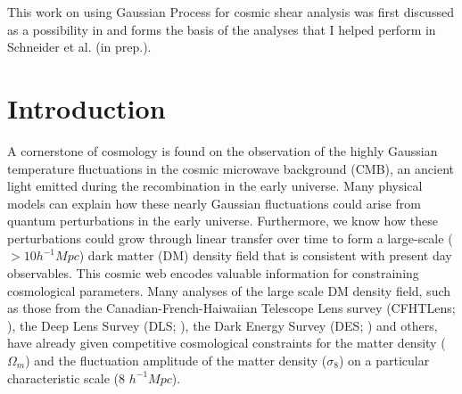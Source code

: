  
This work on using Gaussian Process for cosmic shear analysis 
was first discussed as a possibility in  \citep{Schneider2014}  and 
forms the basis of the analyses that I helped perform 
in Schneider et al. (in prep.). 

\section{Introduction} 

A cornerstone of cosmology is found on the 
observation of the highly Gaussian temperature fluctuations in the cosmic microwave 
background (CMB), an ancient light emitted during the recombination in the early
universe. Many physical models can explain how these
nearly Gaussian fluctuations could arise from quantum perturbations in the 
early universe. Furthermore, we know how these perturbations could grow
through linear transfer over time to form a large-scale ($> 10 h^{-1} Mpc$) 
dark matter (DM) density field that is consistent with present
day observables. 
This cosmic web encodes valuable information for constraining cosmological
parameters. Many analyses of the large scale DM density field, such as those from
the Canadian-French-Haiwaiian Telescope Lens survey (CFHTLens;
\citealt{Kilbinger2013}), the Deep Lens Survey
(DLS; \citealt{Jee2013a}), the Dark Energy Survey (DES; \citealt{Abbott2016}) and others, 
have already given competitive cosmological constraints for 
 the matter density ($\Omega_m$) and the fluctuation amplitude 
of the matter density ($\sigma_8$) on a particular characteristic scale (8
$h^{-1} Mpc$). 


